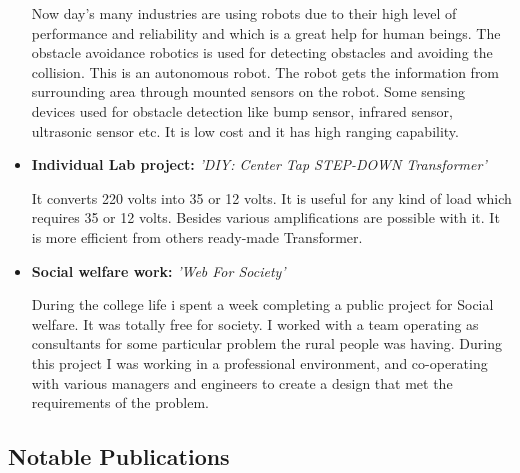\documentclass[11pt,a4paper,sans]{moderncv}        %
\begin{document}
\begin{itemize}
{\small{Now day’s many industries are using robots due to their high level of performance and reliability and which is a great help for human beings. The obstacle avoidance robotics is used for detecting obstacles and avoiding the collision. This is an autonomous robot.
The robot gets the information from surrounding area through mounted sensors on the robot. Some sensing devices used for obstacle detection like bump sensor, infrared sensor, ultrasonic sensor etc. It is low cost and it has high ranging capability.}}

\vspace{6pt}

\item{\textbf{Individual Lab project:} \textit{'DIY: Center Tap STEP-DOWN Transformer'}

\vspace{3pt}

\small{It converts 220 volts into 35 or 12 volts. It is useful for any kind of load which requires 35 or 12 volts. Besides various amplifications are possible with it. It is more efficient from others ready-made Transformer.}}

\vspace{6pt}

\item{\textbf{Social welfare work:} \textit{'Web For Society'}

\vspace{3pt}

\small{During the college life i spent a week completing a public project for Social welfare. It was totally free for society. I worked with a team operating as consultants for some particular problem the rural people was having. During this project I was working in a professional environment, and co-operating with various managers and engineers to create a design that met the requirements of the problem.}}

\end{itemize}

\newpage

\subsection{Notable Publications}

\vspace{5pt}
\end{document}
